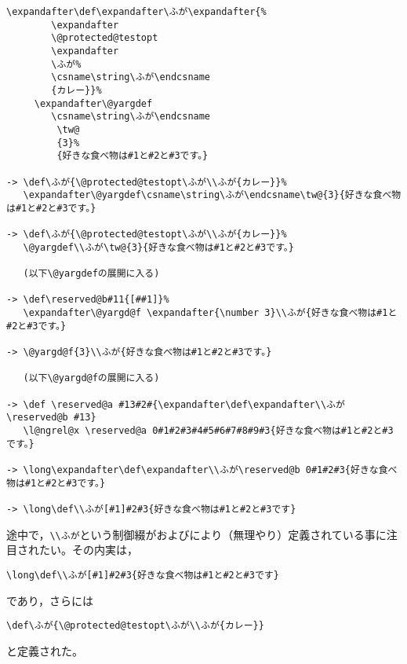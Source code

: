 \documentclass[autodetect-engine,dvipdfmx]{jsarticle}
\begin{document}
\begin{lstlisting}
\expandafter\def\expandafter\ふが\expandafter{%
        \expandafter
        \@protected@testopt
        \expandafter
        \ふが%
        \csname\string\ふが\endcsname
        {カレー}}%
     \expandafter\@yargdef
        \csname\string\ふが\endcsname
         \tw@
         {3}%
         {好きな食べ物は#1と#2と#3です。}

-> \def\ふが{\@protected@testopt\ふが\\ふが{カレー}}%
   \expandafter\@yargdef\csname\string\ふが\endcsname\tw@{3}{好きな食べ物は#1と#2と#3です。}

-> \def\ふが{\@protected@testopt\ふが\\ふが{カレー}}%
   \@yargdef\\ふが\tw@{3}{好きな食べ物は#1と#2と#3です。}

   (以下\@yargdefの展開に入る)

-> \def\reserved@b#11{[##1]}%
   \expandafter\@yargd@f \expandafter{\number 3}\\ふが{好きな食べ物は#1と#2と#3です。}

-> \@yargd@f{3}\\ふが{好きな食べ物は#1と#2と#3です。}

   (以下\@yargd@fの展開に入る)

-> \def \reserved@a #13#2#{\expandafter\def\expandafter\\ふが\reserved@b #13}
   \l@ngrel@x \reserved@a 0#1#2#3#4#5#6#7#8#9#3{好きな食べ物は#1と#2と#3です。}

-> \long\expandafter\def\expandafter\\ふが\reserved@b 0#1#2#3{好きな食べ物は#1と#2と#3です。}

-> \long\def\\ふが[#1]#2#3{好きな食べ物は#1と#2と#3です}

\end{lstlisting}

途中で，\preSub\verb|\\ふが|\preSub という制御綴がおよびにより（無理やり）定義されている事に注目されたい。その内実は，
\begin{lstlisting}
\long\def\\ふが[#1]#2#3{好きな食べ物は#1と#2と#3です}
\end{lstlisting}
であり，さらには
\begin{lstlisting}
\def\ふが{\@protected@testopt\ふが\\ふが{カレー}}
\end{lstlisting}
と定義された。
\end{document}
